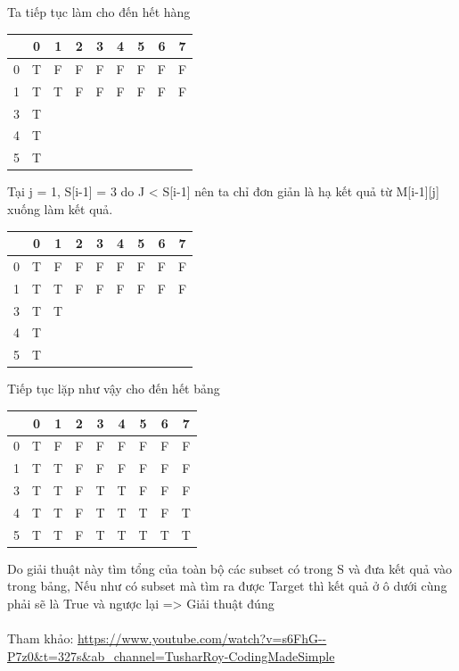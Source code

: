 \documentclass{article}
\begin{document}
    Ta tiếp tục làm cho đến hết hàng \\
    \begin{center}
        \begin{tabular}{|c|c|c|c|c|c|c|c|c|}
        \hline
        {}&{0}&{1}&{2}&{3}&{4}&{5}&{6}&{7}\\
        \hline
        0&T&F&F&F&F&F&F&F\\
        \hline
        1&T&T&F&F&F&F&F&F\\
        \hline
        3&T&&&&&&&\\
        \hline
        4&T&&&&&&&\\
        \hline
        5&T&&&&&&&\\
        \hline
    \end{tabular}
    \end{center}
    Tại j = 1, S[i-1] = 3 do J < S[i-1] nên ta chỉ đơn giản là hạ kết quả từ M[i-1][j] xuống làm kết quả.\\
    \begin{center}
        \begin{tabular}{|c|c|c|c|c|c|c|c|c|}
        \hline
        {}&{0}&{1}&{2}&{3}&{4}&{5}&{6}&{7}\\
        \hline
        0&T&F&F&F&F&F&F&F\\
        \hline
        1&T&T&F&F&F&F&F&F\\
        \hline
        3&T&T&&&&&&\\
        \hline
        4&T&&&&&&&\\
        \hline
        5&T&&&&&&&\\
        \hline
    \end{tabular}
    \end{center}
    Tiếp tục lặp như vậy cho đến hết bảng\\
    \begin{center}
        \begin{tabular}{|c|c|c|c|c|c|c|c|c|}
        \hline
        {}&{0}&{1}&{2}&{3}&{4}&{5}&{6}&{7}\\
        \hline
        0&T&F&F&F&F&F&F&F\\
        \hline
        1&T&T&F&F&F&F&F&F\\
        \hline
        3&T&T&F&T&T&F&F&F\\
        \hline
        4&T&T&F&T&T&T&F&T\\
        \hline
        5&T&T&F&T&T&T&T&T\\
        \hline
    \end{tabular}
    \end{center}
    Do giải thuật này tìm tổng của toàn bộ các subset có trong S và đưa kết quả vào trong bảng, Nếu như có subset mà tìm ra được Target thì kết quả ở ô dưới cùng phải sẽ là True và ngược lại => Giải thuật đúng\\\\
    Tham khảo: \url{https://www.youtube.com/watch?v=s6FhG--P7z0&t=327s&ab_channel=TusharRoy-CodingMadeSimple}
    
\end{document}
